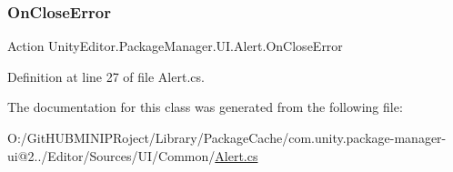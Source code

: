 \subsubsection{\texorpdfstring{OnCloseError}{OnCloseError}}
{\footnotesize\ttfamily Action Unity\+Editor.\+Package\+Manager.\+U\+I.\+Alert.\+On\+Close\+Error}



Definition at line 27 of file Alert.\+cs.



The documentation for this class was generated from the following file\+:\begin{DoxyCompactItemize}
\item 
O\+:/\+Git\+H\+U\+B\+M\+I\+N\+I\+P\+Roject/\+Library/\+Package\+Cache/com.\+unity.\+package-\/manager-\/ui@2../\+Editor/\+Sources/\+U\+I/\+Common/\mbox{\hyperlink{_alert_8cs}{Alert.\+cs}}\end{DoxyCompactItemize}
